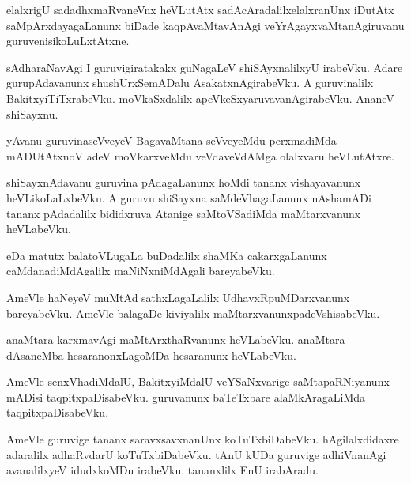 \documentclass{article}
\begin{document}
\begin{mn}%
elalxrigU sadadhxmaRvaneVnx heVLutAtx sadAcAradalilxelalxranUnx iDutAtx 
saMpArxdayagaLanunx biDade kaqpAvaMtavAnAgi veYrAgayxvaMtanAgiruvanu guruvenisikoLuLxtAtxne.
\end{mn}

\begin{mn}%
sAdharaNavAgi I guruvigiratakakx guNagaLeV shiSAyxnalilxyU irabeVku. Adare gurupAdavanunx 
shushUrxSemADalu AsakatxnAgirabeVku. A guruvinalilx BakitxyiTiTxrabeVku. moVkaSxdalilx 
apeVkeSxyaruvavanAgirabeVku. AnaneV shiSayxnu.
\end{mn}

\begin{mn}%
yAvanu guruvinaseVveyeV BagavaMtana seVveyeMdu perxmadiMda mADUtAtxnoV adeV moVkarxveMdu 
veVdaveVdAMga olalxvaru heVLutAtxre.
\end{mn}

\begin{mn}%
shiSayxnAdavanu guruvina pAdagaLanunx hoMdi tananx vishayavanunx heVLikoLaLxbeVku. A 
guruvu shiSayxna saMdeVhagaLanunx nAshamADi tananx pAdadalilx bididxruva Atanige 
saMtoVSadiMda maMtarxvanunx heVLabeVku.
\end{mn}

\begin{mn}%
eDa matutx balatoVLugaLa buDadalilx shaMKa cakarxgaLanunx caMdanadiMdAgalilx 
maNiNxniMdAgali bareyabeVku.
\end{mn}

\begin{mn}%
AmeVle haNeyeV muMtAd sathxLagaLalilx UdhavxRpuMDarxvanunx bareyabeVku. AmeVle balagaDe 
kiviyalilx maMtarxvanunxpadeVshisabeVku.
\end{mn}

\begin{mn}%
anaMtara karxmavAgi maMtArxthaRvanunx heVLabeVku. anaMtara dAsaneMba hesaranonxLagoMDa 
hesaranunx heVLabeVku.
\end{mn}

\begin{mn}%
AmeVle senxVhadiMdalU, BakitxyiMdalU veYSaNxvarige saMtapaRNiyanunx mADisi 
taqpitxpaDisabeVku. guruvanunx baTeTxbare alaMkAragaLiMda taqpitxpaDisabeVku.
\end{mn}

\begin{mn}%
AmeVle guruvige tananx saravxsavxnanUnx koTuTxbiDabeVku. hAgilalxdidaxre adaralilx 
adhaRvdarU koTuTxbiDabeVku. tAnU kUDa guruvige adhiVnanAgi avanalilxyeV idudxkoMDu 
irabeVku. tananxlilx EnU irabAradu.
\end{mn}
\end{document}
